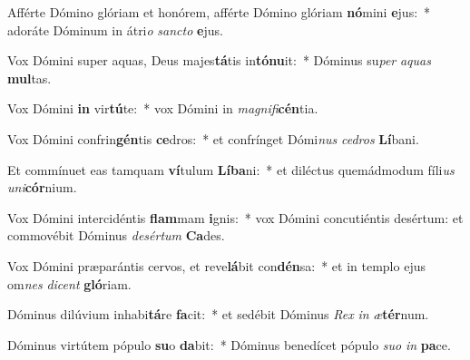 \item Afférte Dómino glóriam et honórem, afférte Dómino glóriam \textbf{nó}mini \textbf{e}jus:~* adoráte Dóminum in átri\textit{o} \textit{sanc}\textit{to} \textbf{e}jus.
\item Vox Dómini super aquas, Deus majes\textbf{tá}tis in\textbf{tó}\textbf{nu}it:~* Dóminus su\textit{per} \textit{a}\textit{quas} \textbf{mul}tas.
\item Vox Dómini \textbf{in} vir\textbf{tú}te:~* vox Dómini in \textit{ma}\textit{gni}\textit{fi}\textbf{cén}tia.
\item Vox Dómini confrin\textbf{gén}tis \textbf{ce}dros:~* et confrínget Dómi\textit{nus} \textit{ce}\textit{dros} \textbf{Lí}bani.
\item Et commínuet eas tamquam \textbf{ví}tulum \textbf{Lí}\textbf{ba}ni:~* et diléctus quemádmodum fíli\textit{us} \textit{u}\textit{ni}\textbf{cór}nium.
\item Vox Dómini intercidéntis \textbf{flam}mam \textbf{i}gnis:~* vox Dómini concutiéntis desértum: et commovébit Dóminus \textit{de}\textit{sér}\textit{tum} \textbf{Ca}des.
\item Vox Dómini præparántis cervos, et reve\textbf{lá}bit con\textbf{dén}sa:~* et in templo ejus om\textit{nes} \textit{di}\textit{cent} \textbf{gló}riam.
\item Dóminus dilúvium inhabi\textbf{tá}re \textbf{fa}cit:~* et sedébit Dóminus \textit{Rex} \textit{in} \textit{æ}\textbf{tér}num.
\item Dóminus virtútem pópulo \textbf{su}o \textbf{da}bit:~* Dóminus benedícet pópulo \textit{su}\textit{o} \textit{in} \textbf{pa}ce.
